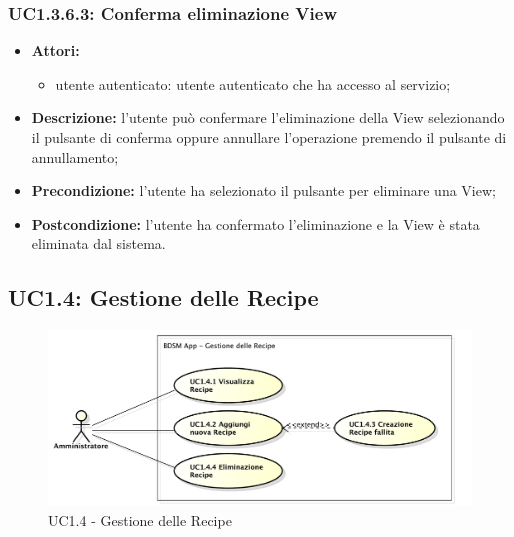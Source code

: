 \subsubsection{UC1.3.6.3: Conferma eliminazione View}

\begin{itemize}
	\item \textbf{Attori:}
	\begin{itemize}
		\item utente autenticato: utente autenticato che ha accesso al servizio;
	\end{itemize}
	\item \textbf{Descrizione:} l'utente può confermare l'eliminazione della View selezionando il pulsante di conferma oppure annullare l'operazione premendo il pulsante di annullamento;
	\item \textbf{Precondizione:} l'utente ha selezionato il pulsante per eliminare una View;
	\item \textbf{Postcondizione:} l'utente ha confermato l'eliminazione e la View è stata eliminata dal sistema.
\end{itemize}

\pagebreak


\subsection{UC1.4: Gestione delle Recipe}

\begin{figure}[!ht]
	\centering
	\centerline{\includegraphics[scale=0.45]{./images/UC1_4.pdf}}
	\caption{UC1.4 - Gestione delle Recipe}
\end{figure}

